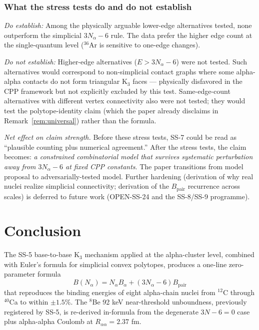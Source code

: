 \documentclass[11pt,letterpaper]{article}
\newcommand{\Bpair}{B_{\mathrm{pair}}}
\newcommand{\Balpha}{B_{\alpha}}
\newcommand{\Nalpha}{N_{\alpha}}
\newcommand{\Raa}{R_{\alpha\alpha}}
\begin{document}
\subsubsection{What the stress tests do and do not establish}

\emph{Do establish:} Among the physically arguable lower-edge alternatives tested, none outperform the simplicial $3\Nalpha - 6$ rule. The data prefer the higher edge count at the single-quantum level (${}^{36}$Ar is sensitive to one-edge changes).

\emph{Do not establish:} Higher-edge alternatives ($E > 3\Nalpha - 6$) were not tested. Such alternatives would correspond to non-simplicial contact graphs where some alpha-alpha contacts do not form triangular K$_3$ faces --- physically disfavored in the CPP framework but not explicitly excluded by this test. Same-edge-count alternatives with different vertex connectivity also were not tested; they would test the polytope-identity claim (which the paper already disclaims in Remark~\ref{rem:universal}) rather than the formula.

\emph{Net effect on claim strength.} Before these stress tests, SS-7 could be read as ``plausible counting plus numerical agreement.'' After the stress tests, the claim becomes: \emph{a constrained combinatorial model that survives systematic perturbation away from $3\Nalpha - 6$ at fixed CPP constants}. The paper transitions from model proposal to adversarially-tested model. Further hardening (derivation of why real nuclei realize simplicial connectivity; derivation of the $\Bpair$ recurrence across scales) is deferred to future work (OPEN-SS-24 and the SS-8/SS-9 programme).

\section{Conclusion}
\label{sec:conclusion}

The SS-5 base-to-base K$_3$ mechanism applied at the alpha-cluster level, combined with Euler's formula for simplicial convex polytopes, produces a one-line zero-parameter formula
\[
B(\Nalpha) = \Nalpha \Balpha + (3\Nalpha - 6) \Bpair
\]
that reproduces the binding energies of eight alpha-chain nuclei from ${}^{12}$C through ${}^{40}$Ca to within $\pm 1.5\%$. The ${}^8$Be 92 keV near-threshold unboundness, previously registered by SS-5, is re-derived in-formula from the degenerate $3N - 6 = 0$ case plus alpha-alpha Coulomb at $\Raa = 2.37$ fm.
\end{document}
